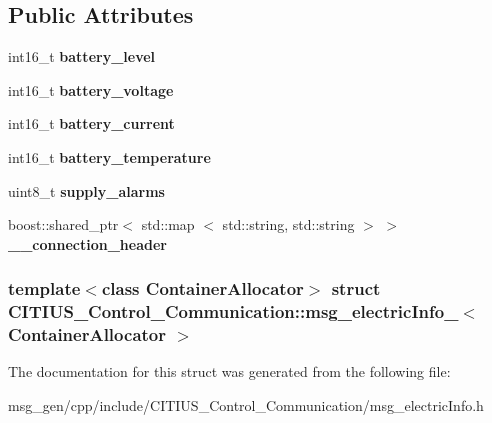 \subsection*{\-Public \-Attributes}
\begin{DoxyCompactItemize}
\item 
\hypertarget{struct_c_i_t_i_u_s___control___communication_1_1msg__electric_info___a5c1d5c73d62ad1a5205baa3a8a596896}{int16\-\_\-t {\bfseries battery\-\_\-level}}\label{struct_c_i_t_i_u_s___control___communication_1_1msg__electric_info___a5c1d5c73d62ad1a5205baa3a8a596896}

\item 
\hypertarget{struct_c_i_t_i_u_s___control___communication_1_1msg__electric_info___a72e47d2f408d93c50e9476df867bb038}{int16\-\_\-t {\bfseries battery\-\_\-voltage}}\label{struct_c_i_t_i_u_s___control___communication_1_1msg__electric_info___a72e47d2f408d93c50e9476df867bb038}

\item 
\hypertarget{struct_c_i_t_i_u_s___control___communication_1_1msg__electric_info___a876c79129c47556fdb0bdfb45598d25e}{int16\-\_\-t {\bfseries battery\-\_\-current}}\label{struct_c_i_t_i_u_s___control___communication_1_1msg__electric_info___a876c79129c47556fdb0bdfb45598d25e}

\item 
\hypertarget{struct_c_i_t_i_u_s___control___communication_1_1msg__electric_info___ac4a7f41499d7c4bc702c94a99190ffc7}{int16\-\_\-t {\bfseries battery\-\_\-temperature}}\label{struct_c_i_t_i_u_s___control___communication_1_1msg__electric_info___ac4a7f41499d7c4bc702c94a99190ffc7}

\item 
\hypertarget{struct_c_i_t_i_u_s___control___communication_1_1msg__electric_info___aa39e0b8c5e6a26816b59c7ba10ddde18}{uint8\-\_\-t {\bfseries supply\-\_\-alarms}}\label{struct_c_i_t_i_u_s___control___communication_1_1msg__electric_info___aa39e0b8c5e6a26816b59c7ba10ddde18}

\item 
\hypertarget{struct_c_i_t_i_u_s___control___communication_1_1msg__electric_info___a2b5b078b4831f3cfff1f26b859eb2c6e}{boost\-::shared\-\_\-ptr$<$ std\-::map\*
$<$ std\-::string, std\-::string $>$ $>$ {\bfseries \-\_\-\-\_\-connection\-\_\-header}}\label{struct_c_i_t_i_u_s___control___communication_1_1msg__electric_info___a2b5b078b4831f3cfff1f26b859eb2c6e}

\end{DoxyCompactItemize}
\subsubsection*{template$<$class Container\-Allocator$>$ struct C\-I\-T\-I\-U\-S\-\_\-\-Control\-\_\-\-Communication\-::msg\-\_\-electric\-Info\-\_\-$<$ Container\-Allocator $>$}



\-The documentation for this struct was generated from the following file\-:\begin{DoxyCompactItemize}
\item 
msg\-\_\-gen/cpp/include/\-C\-I\-T\-I\-U\-S\-\_\-\-Control\-\_\-\-Communication/msg\-\_\-electric\-Info.\-h\end{DoxyCompactItemize}

